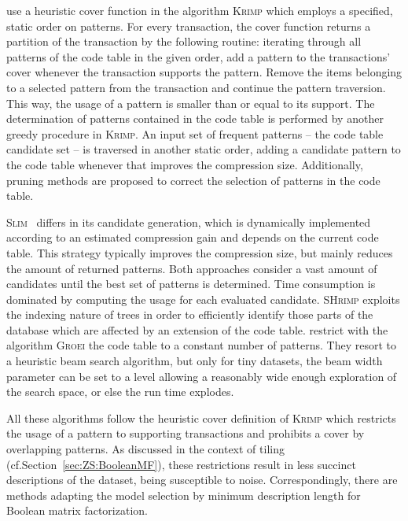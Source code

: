 \cite{siebes2006item} use a heuristic cover function in the algorithm \textsc{Krimp} which employs a specified, static order on patterns. For every transaction, the cover function returns a partition of the transaction by the following routine: iterating through all patterns of the code table in the given order, add a pattern to the transactions' cover whenever the transaction supports the pattern. Remove the items belonging to a selected pattern from the transaction and continue the pattern traversion. This way, the usage of a pattern is smaller than or equal to its support.
The determination of patterns contained in the code table is performed by another greedy procedure in \textsc{Krimp}. An input set of frequent patterns -- the code table candidate set -- is traversed in another static order, adding a candidate pattern to the code table whenever that improves the compression size. Additionally, pruning methods are proposed to correct the selection of patterns in the code table.

\textsc{Slim}~\citep{smets2012slim} differs in its candidate generation, which is   dynamically implemented according to an estimated compression gain and depends on the current code table. This strategy typically improves the compression size, but mainly reduces  the  amount of returned patterns.  
Both approaches consider a vast amount of candidates until the best set of patterns is determined. Time consumption is dominated by computing the usage for each evaluated candidate.
\textsc{SHrimp} \citep{hess2014shrimp} exploits the indexing nature of trees in order to efficiently identify those parts of the database which are affected by an extension of the code table.
\cite{siebes2011structure} restrict with the algorithm \textsc{Groei} the code table to a constant number of patterns. They resort to a heuristic beam search algorithm,
but only for tiny datasets, the beam width parameter can be set to a level allowing a reasonably wide enough exploration of the search space, or else the run time explodes.

All these algorithms follow the heuristic cover definition of \textsc{Krimp} which restricts the usage of a pattern to supporting transactions and prohibits a cover by overlapping patterns. As discussed in the context of tiling (cf.\@ Section~\ref{sec:ZS:BooleanMF}), these restrictions result in less succinct descriptions of the dataset, being susceptible to noise. Correspondingly, there are methods adapting the model selection by minimum description length for Boolean matrix factorization.
